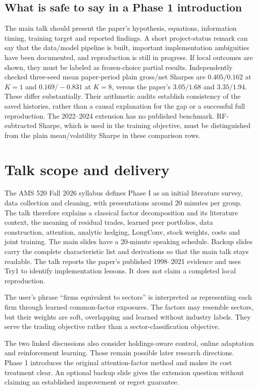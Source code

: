 \documentclass[11pt]{article}
\begin{document}
\subsection{What is safe to say in a Phase 1 introduction}

The main talk should present the paper's hypothesis, equations,
information timing, training target and reported findings. A short
project-status remark can say that the data/model pipeline is built,
important implementation ambiguities have been documented, and
reproduction is still in progress. If local outcomes are shown, they
must be labeled as frozen-choice partial results. Independently checked
three-seed mean paper-period plain gross/net Sharpes are
$0.405/0.162$ at $K=1$ and $0.169/-0.831$ at $K=8$, versus the paper's
$3.05/1.68$ and $3.35/1.94$. These differ substantially. Their arithmetic
audits establish consistency of the saved histories, rather than a
causal explanation for the gap or a successful full reproduction.
The 2022--2024 extension has no published benchmark. RF-subtracted
Sharpe, which is used in the training objective, must be distinguished
from the plain mean/volatility Sharpe in these comparison rows.


\section{Talk scope and delivery}
The AMS 520 Fall 2026 syllabus defines Phase I as an initial literature survey, data collection and cleaning, with presentations around 20 minutes per group. The talk therefore explains a classical factor decomposition and its literature context, the meaning of residual trades, learned peer portfolios, data construction, attention, analytic hedging, LongConv, stock weights, costs and joint training. The main slides have a 20-minute speaking schedule. Backup slides carry the complete characteristic list and derivations so that the main talk stays readable. The talk reports the paper's published 1998--2021 evidence and uses Try1 to identify implementation lessons. It does not claim a completed local reproduction.

The user's phrase ``firms equivalent to sectors'' is interpreted as representing each firm through learned common-factor exposures. The factors may resemble sectors, but their weights are soft, overlapping and learned without industry labels. They serve the trading objective rather than a sector-classification objective.

The two linked discussions also consider holdings-aware control, online adaptation and reinforcement learning. Those remain possible later research directions. Phase 1 introduces the original attention-factor method and makes its cost treatment clear. An optional backup slide gives the extension question without claiming an established improvement or regret guarantee.
\end{document}
